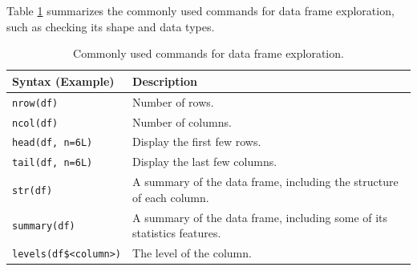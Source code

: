 Table \ref{ch:r1:tab:dataframeexplore} summarizes the commonly used commands for data frame exploration, such as checking its shape and data types.
\begin{table}
  \centering \caption{Commonly used commands for data frame exploration.}\label{ch:r1:tab:dataframeexplore}
  \begin{tabularx}{\textwidth}{lX}
    \hline
    Syntax (Example) & Description \\ \hline
    \verb|nrow(df)| & Number of rows. \\
    \verb|ncol(df)| & Number of columns. \\
    \verb|head(df, n=6L)| & Display the first few rows. \\
    \verb|tail(df, n=6L)| & Display the last few columns. \\
    \verb|str(df)| & A summary of the data frame, including the structure of each column. \\
    \verb|summary(df)| & A summary of the data frame, including some of its statistics features. \\
    \verb|levels(df$<column>)| & The level of the column. \\
    \hline
  \end{tabularx}
\end{table}

